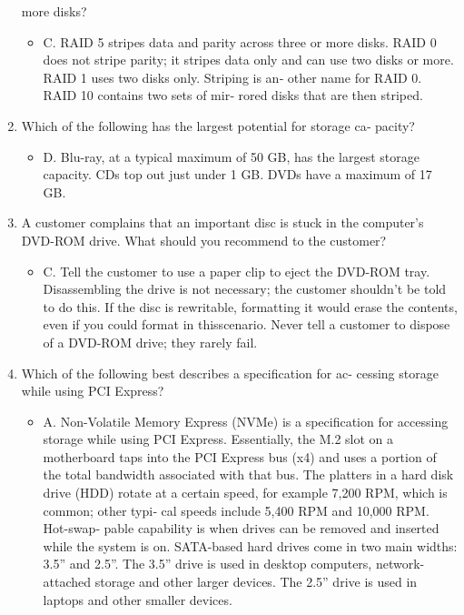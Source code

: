 \documentclass{article}
\begin{document}
\begin{enumerate}
more disks?
    \begin{itemize}
        \item C. RAID 5 stripes data and parity across three or more disks.
RAID 0 does not stripe parity; it stripes data only and can use
two disks or more. RAID 1 uses two disks only. Striping is an‐
other name for RAID 0. RAID 10 contains two sets of mir‐
rored disks that are then striped.
    \end{itemize}
    \item Which of the following has the largest potential for storage ca‐
pacity?
    \begin{itemize}
        \item D. Blu-ray, at a typical maximum of 50 GB, has the largest
storage capacity. CDs top out just under 1 GB. DVDs have a
maximum of 17 GB.
    \end{itemize}
    \item A customer complains that an important disc is stuck in the
computer’s DVD-ROM drive. What should you recommend to
the customer?
    \begin{itemize}
        \item C. Tell the customer to use a paper clip to eject the DVD-ROM
tray. Disassembling the drive is not necessary; the customer
shouldn’t be told to do this. If the disc is rewritable, formatting
it would erase the contents, even if you could format in thisscenario. Never tell a customer to dispose of a DVD-ROM
drive; they rarely fail.
    \end{itemize}
    \item Which of the following best describes a specification for ac‐
cessing storage while using PCI Express?
    \begin{itemize}
        \item A. Non-Volatile Memory Express (NVMe) is a specification
for accessing storage while using PCI Express. Essentially, the
M.2 slot on a motherboard taps into the PCI Express bus (x4)
and uses a portion of the total bandwidth associated with that
bus. The platters in a hard disk drive (HDD) rotate at a certain
speed, for example 7,200 RPM, which is common; other typi‐
cal speeds include 5,400 RPM and 10,000 RPM. Hot-swap‐
pable capability is when drives can be removed and inserted
while the system is on. SATA-based hard drives come in two
main widths: 3.5” and 2.5”. The 3.5” drive is used in desktop
computers, network-attached storage and other larger devices.
The 2.5” drive is used in laptops and other smaller devices.
    \end{itemize}

\end{enumerate}
\end{document}
